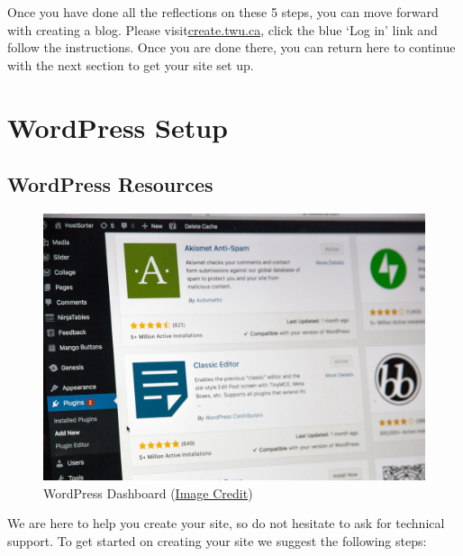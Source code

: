 \documentclass[
]{book}
\begin{document}
Once you have done all the reflections on these 5 steps, you can move forward with creating a blog. Please visit\href{https://create.twu.ca}{create.twu.ca}, click the blue `Log in' link and follow the instructions. Once you are done there, you can return here to continue with the next section to get your site set up.

\hypertarget{wordpress-setup}{%
\section{WordPress Setup}\label{wordpress-setup}}

\hypertarget{wordpress-resources}{%
\subsection*{WordPress Resources}\label{wordpress-resources}}

\begin{figure}
\centering
\includegraphics{assets/u1/stephen-phillips-hostreviews-co-uk-sSPzmL7fpWc-unsplash.jpg}
\caption{WordPress Dashboard (\href{https://unsplash.com/photos/sSPzmL7fpWc}{Image Credit})}
\end{figure}

We are here to help you create your site, so do not hesitate to ask for technical support. To get started on creating your site we suggest the following steps:
\end{document}
